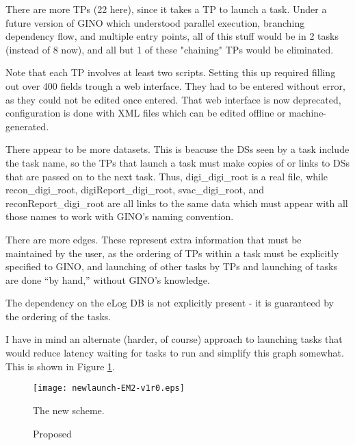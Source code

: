\documentclass{article}
\begin{document}
There are more TPs (22 here), since it takes a TP to launch a task.  Under a
future version of GINO which understood parallel execution, branching
dependency flow, and multiple entry points, all of this stuff would be in 2
tasks (instead of 8 now), and all but 1 of these "chaining" TPs would be
eliminated.  

Note that each TP involves at least two scripts.  Setting this up required
filling out over 400 fields trough a web interface.  They had to be entered
without error, as they could not be edited once entered.  That web interface
is now deprecated, configuration is done with XML files which can be edited
offline or machine-generated.

There appear to be more datasets.  This is beacuse the DSs seen by a task
include the task name, so the TPs that launch a task must make copies of or
links to DSs that are passed on to the next task.  Thus, digi\_digi\_root is a
real file, while recon\_digi\_root, digiReport\_digi\_root, svac\_digi\_root,
and reconReport\_digi\_root are all links to the same data which must appear
with all those names to work with GINO's naming convention.

There are more edges.  These represent extra information that must be
maintained by the user, as the ordering of TPs within a task must be
explicitly specified to GINO, and launching of other tasks by TPs and
launching of tasks are done ``by hand,'' without GINO's knowledge.

The dependency on the eLog DB is not explicitly present - it is guaranteed by
the ordering of the tasks.

I have in mind an alternate (harder, of course) approach to launching tasks
that would reduce latency waiting for tasks to run and simplify this graph
somewhat.  This is shown in Figure \ref{newlaunch-fig}.


\begin{figure}
\label{newlaunch-fig}
\caption{Proposed}

\texttt{[image: newlaunch-EM2-v1r0.eps]}

{The new scheme.}

\end{figure}
\end{document}
